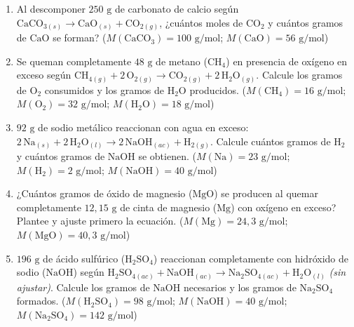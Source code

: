 \documentclass[12pt, letterpaper]{article}
\begin{document}
\begin{enumerate}[leftmargin=*, start=13]
  \item \medio{}\hspace{0.55em}Al descomponer $250\text{ g}$ de carbonato de calcio según $\text{CaCO}_{3(s)} \longrightarrow \text{CaO}_{(s)} + \text{CO}_{2(g)}$, ¿cuántos moles de $\text{CO}_2$ y cuántos gramos de $\text{CaO}$ se forman? ($M(\text{CaCO}_3) = 100\text{ g/mol}$; $M(\text{CaO}) = 56\text{ g/mol}$)

  \item \medio{}\hspace{0.55em}Se queman completamente $48\text{ g}$ de metano ($\text{CH}_4$) en presencia de oxígeno en exceso según $\text{CH}_{4(g)} + 2\,\text{O}_{2(g)} \longrightarrow \text{CO}_{2(g)} + 2\,\text{H}_2\text{O}_{(g)}$. Calcule los gramos de $\text{O}_2$ consumidos y los gramos de $\text{H}_2\text{O}$ producidos. ($M(\text{CH}_4) = 16\text{ g/mol}$; $M(\text{O}_2) = 32\text{ g/mol}$; $M(\text{H}_2\text{O}) = 18\text{ g/mol}$)

  \item \medio{}\hspace{0.55em}$92\text{ g}$ de sodio metálico reaccionan con agua en exceso: $2\,\text{Na}_{(s)} + 2\,\text{H}_2\text{O}_{(l)} \longrightarrow 2\,\text{NaOH}_{(ac)} + \text{H}_{2(g)}$. Calcule cuántos gramos de $\text{H}_2$ y cuántos gramos de $\text{NaOH}$ se obtienen. ($M(\text{Na}) = 23\text{ g/mol}$; $M(\text{H}_2) = 2\text{ g/mol}$; $M(\text{NaOH}) = 40\text{ g/mol}$)

  \item \dificil{}\hspace{0.55em}¿Cuántos gramos de óxido de magnesio ($\text{MgO}$) se producen al quemar completamente $12{,}15\text{ g}$ de cinta de magnesio ($\text{Mg}$) con oxígeno en exceso? Plantee y ajuste primero la ecuación. ($M(\text{Mg}) = 24{,}3\text{ g/mol}$; $M(\text{MgO}) = 40{,}3\text{ g/mol}$)

  \item \dificil{}\hspace{0.55em}$196\text{ g}$ de ácido sulfúrico ($\text{H}_2\text{SO}_4$) reaccionan completamente con hidróxido de sodio ($\text{NaOH}$) según $\text{H}_2\text{SO}_{4(ac)} + \text{NaOH}_{(ac)} \longrightarrow \text{Na}_2\text{SO}_{4(ac)} + \text{H}_2\text{O}_{(l)}$ \emph{(sin ajustar)}. Calcule los gramos de $\text{NaOH}$ necesarios y los gramos de $\text{Na}_2\text{SO}_4$ formados. ($M(\text{H}_2\text{SO}_4) = 98\text{ g/mol}$; $M(\text{NaOH}) = 40\text{ g/mol}$; $M(\text{Na}_2\text{SO}_4) = 142\text{ g/mol}$)


\end{enumerate}
\end{document}
